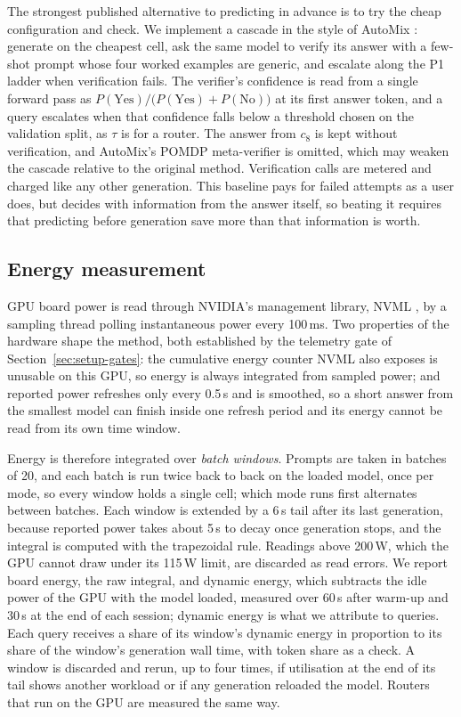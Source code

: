 The strongest published alternative to predicting in advance is to try the
cheap configuration and check. We implement a cascade in the style of AutoMix
\cite{aggarwal2024automix}: generate on the cheapest cell, ask the same model
to verify its answer with a few-shot prompt whose four worked examples are
generic, and escalate along the P1 ladder when verification fails. The
verifier's confidence is read from a single forward pass as
$P(\text{Yes})/\bigl(P(\text{Yes}) + P(\text{No})\bigr)$ at its first answer
token, and a query escalates when that confidence falls below a threshold
chosen on the validation split, as $\tau$ is for a router. The answer from
$c_8$ is kept without verification, and AutoMix's POMDP meta-verifier is
omitted, which may weaken the cascade relative to the original method.
Verification calls are metered and charged like any other generation. This
baseline pays for failed attempts as a user does, but decides with
information from the answer itself, so beating it requires that predicting
before generation save more than that information is worth.

\subsection{Energy measurement}
\label{sec:energy}

GPU board power is read through NVIDIA's management library, NVML
\cite{nvidia_nvml}, by a sampling thread polling instantaneous power every
100\,ms. Two properties of the hardware shape the method, both established by
the telemetry gate of Section~\ref{sec:setup-gates}: the cumulative energy
counter NVML also exposes is unusable on this GPU, so energy is always
integrated from sampled power; and reported power refreshes only every 0.5\,s
and is smoothed, so a short answer from the smallest model can finish inside
one refresh period and its energy cannot be read from its own time window.

Energy is therefore integrated over \emph{batch windows}. Prompts are taken
in batches of 20, and each batch is run twice back to back on the loaded
model, once per mode, so every window holds a single cell; which mode runs
first alternates between batches. Each window is extended by a 6\,s tail after
its last generation, because reported power takes about 5\,s to decay once
generation stops, and the integral is computed with the trapezoidal rule.
Readings above 200\,W, which the GPU cannot draw under its 115\,W limit, are
discarded as read errors. We report board energy, the raw integral, and
dynamic energy, which subtracts the idle power of the GPU with the model
loaded, measured over 60\,s after warm-up and 30\,s at the end of each
session; dynamic energy is what we attribute to queries. Each query receives
a share of its window's dynamic energy in proportion to its share of the
window's generation wall time, with token share as a check. A window is
discarded and rerun, up to four times, if utilisation at the end of its tail
shows another workload or if any generation reloaded the model. Routers that
run on the GPU are measured the same way.

